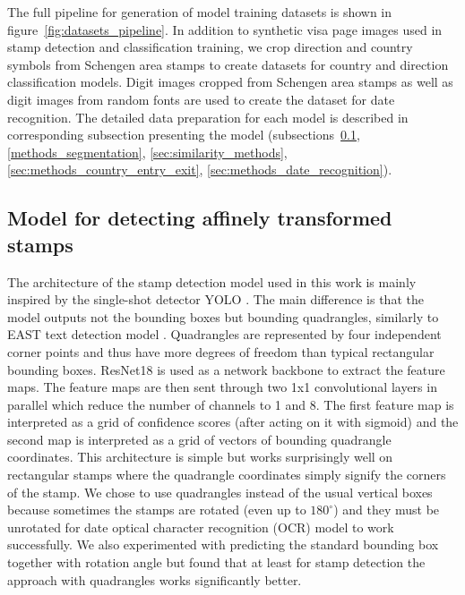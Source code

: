 \documentclass[twocolumn]{svjour3}
\begin{document}
The full pipeline for generation of model training datasets is shown in figure~\ref{fig:datasets_pipeline}. In addition to synthetic visa page images used in stamp detection and classification training, we crop direction and country symbols from Schengen area stamps to create datasets for country and direction classification models. Digit images cropped from Schengen area stamps as well as digit images from random fonts are used to create the dataset for date recognition.
The detailed data preparation for each model is described in corresponding subsection presenting the model (subsections~\ref{sec:methods_stamp_detection}, \ref{methods_segmentation}, \ref{sec:similarity_methods}, \ref{sec:methods_country_entry_exit}, \ref{sec:methods_date_recognition}).


\subsection{Model for detecting affinely transformed stamps}
\label{sec:methods_stamp_detection}

The architecture of the stamp detection model used in this work is mainly inspired by the single-shot detector YOLO \cite{Redmon2016_YOLO}. The main difference is that the model outputs not the bounding boxes but bounding quadrangles, similarly to EAST text detection model \cite{Zhou2107_EAST}. Quadrangles are represented by four independent corner points and thus have more degrees of freedom than typical rectangular bounding boxes. ResNet18 \cite{He2016} is used as a network backbone to extract the feature maps. The feature maps are then sent through two 1x1 convolutional layers in parallel which reduce the number of channels to 1 and 8. The first feature map is interpreted as a grid of confidence scores (after acting on it with sigmoid) and the second map is interpreted as a grid of vectors of bounding quadrangle coordinates. This architecture is simple but works surprisingly well on rectangular stamps where the quadrangle coordinates simply signify the corners of the stamp. We chose to use quadrangles instead of the usual vertical boxes because sometimes the stamps are rotated (even up to $180^\circ$) and they must be unrotated for date optical character recognition (OCR) model to work successfully. We also experimented with predicting the standard bounding box together with rotation angle but found that at least for stamp detection the approach with quadrangles works significantly better.
\end{document}
